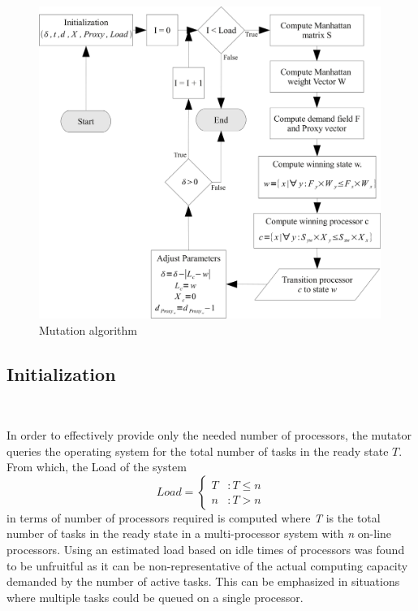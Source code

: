 \begin{figure}[h!]
  \begin{center}
    \includegraphics[height=4in]{figures/Mutation_algo.jpg}
    \caption{Mutation algorithm}
    \label{fig:mutation_algo}
  \end{center}
\end{figure}

\subsection{Initialization}~\label{sec:mut_init}

In order to effectively provide only the needed number of processors, the mutator
queries the operating system for the total number of tasks in the ready state $T$. 
From which, the Load of the system 
\begin{equation}
    Load = \left\{
     \begin{array}{lr}
       T & : T \leq n\\
       n & : T > n
     \end{array}
   \right.
\label{eq:projected_load}
\end{equation}
in terms of number of processors required is computed where \textit{T} is the total number 
of tasks in the ready state in a multi-processor system with \textit{n} on-line processors.
Using an estimated load based on idle times
of processors was found to be unfruitful as it can be non-representative of the actual 
computing capacity demanded by the number of active tasks. This can be emphasized 
in situations where multiple tasks could be queued on a single processor.

